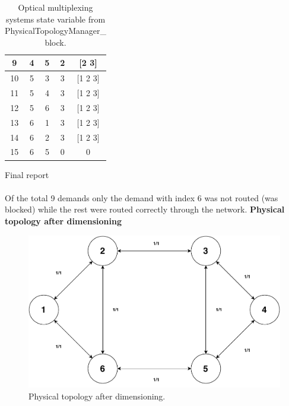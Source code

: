 \begin{table}[H]
\begin{tabular}{|c|c|c|c|c|}
		9        & 4          & 5               & 2                                                                       & {[}2 3{]}                                                         \\ \hline
		10       & 5          & 3               & 3                                                                       & {[}1 2 3{]}                                                       \\ \hline
		11       & 5          & 4               & 3                                                                       & {[}1 2 3{]}                                                       \\ \hline
		12       & 5          & 6               & 3                                                                       & {[}1 2 3{]}                                                       \\ \hline
		13       & 6          & 1               & 3                                                                       & {[}1 2 3{]}                                                       \\ \hline
		14       & 6          & 2               & 3                                                                       & {[}1 2 3{]}                                                       \\ \hline
		15       & 6          & 5               & 0                                                                       & 0                                                                 \\ \hline
	\end{tabular}
	\caption{Optical multiplexing systems state variable from PhysicalTopologyManager\_  block.}
	\label{OMS_example}
\end{table}

\Large Final report\\ \\

\normalsize Of the total 9 demands only the demand with index 6 was not routed (was blocked) while the rest were routed correctly through the network.
\clearpage
\textbf{Physical topology after dimensioning}
\begin{figure}[H]
	\centering
	\includegraphics[width=13cm]{sdf/heuristic/transparent/figures/physicalAfterDimensioning}
	\caption{Physical topology after dimensioning.}
\end{figure}

